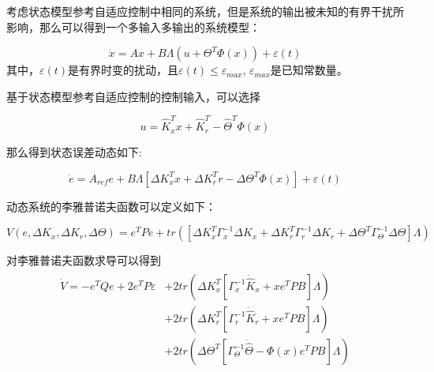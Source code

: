 考虑状态模型参考自适应控制中相同的系统，但是系统的输出被未知的有界干扰所影响，那么可以得到一个多输入多输出的系统模型：

\begin{equation}
\dot{x}=Ax + B \Lambda (u + {{\Theta }^T}{\Phi }(x)) + \varepsilon(t)
\end{equation}
其中，$\varepsilon(t)$是有界时变的扰动，且$\varepsilon(t) \leq \varepsilon_{max}$, $\varepsilon_{max}$是已知常数量。

基于状态模型参考自适应控制的控制输入，可以选择

\begin{equation}
u = \hat K_x^Tx + \hat K_r^T - {\hat \Theta ^T}\Phi \left( x \right)
\end{equation}

那么得到状态误差动态如下:

\begin{equation}
\dot{e}= A_{ref}e + B \Lambda\left[\Delta K_x^T x + \Delta K_r^T r - \Delta \Theta^T \Phi(x)\right]+ \varepsilon(t)
\end{equation}

动态系统的李雅普诺夫函数可以定义如下：

\begin{equation}
V\left( e, \Delta K_x, \Delta K_r, \Delta
\Theta \right) =e^TPe +tr\left( \left[\Delta K_x^T \Gamma_x^{-1} \Delta K_x + \Delta K_r^T \Gamma_r ^{-1} \Delta K_r + \Delta \Theta^T \Gamma _{\Theta}^{-1} \Delta \Theta \right]\Lambda \right)
\end{equation}

对李雅普诺夫函数求导可以得到
\begin{equation}
\begin{array}{l}
\begin{split}
 \dot V =  - {e^T}Qe + 2e^{T}P\varepsilon &+ 2tr\left( {\Delta K_x^T\left[ {\Gamma _x^{ - 1}{{\dot {\hat K}}_x} + x{e^T}PB} \right]\Lambda } \right) \\
 &+  2tr\left( {\Delta K_r^T\left[ {\Gamma _r^{ - 1}{{\dot {\hat K}}_r} + x{e^T}PB} \right]\Lambda } \right) \\
 &+ 2tr\left( {\Delta {\Theta ^T}\left[ {\Gamma _\Theta ^{ - 1}\dot {\hat \Theta}  - \Phi \left( x \right){e^T}PB} \right]\Lambda } \right) \\
 \end{split}
 \end{array}
\end{equation}

